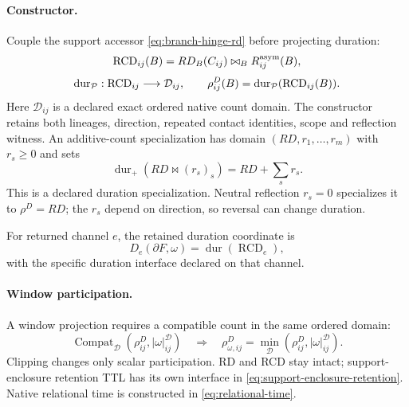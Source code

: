 \paragraph{Constructor.}
\label{subsec:reflection-duration-coupling}
Couple the support accessor \eqref{eq:branch-hinge-rd} before projecting duration:
\begin{equation}
\mathrm{RCD}_{ij}(B)=RD_B(C_{ij})\bowtie_B R^{\mathrm{asym}}_{ij}(B),
\label{eq:rcd-coupling}
\end{equation}
\begin{equation}
\operatorname{dur}_{\mathcal P}:\mathrm{RCD}_{ij}\longrightarrow\mathcal D_{ij},
\qquad \rho^D_{ij}(B)=\operatorname{dur}_{\mathcal P}(\mathrm{RCD}_{ij}(B)).
\label{eq:rcd-duration-participation}
\end{equation}
Here \(\mathcal D_{ij}\) is a declared exact ordered native count domain.
The constructor retains both lineages, direction, repeated contact identities,
scope and reflection witness. An additive-count specialization has domain
\((RD,r_1,\ldots,r_m)\) with \(r_s\ge0\) and sets
\begin{equation}
\operatorname{dur}_{+}(RD\bowtie(r_s)_s)=RD+\sum_s r_s.
\label{eq:rcd-additive-realization}
\end{equation}
This is a declared duration specialization. Neutral reflection \(r_s=0\)
specializes it to \(\rho^D=RD\); the \(r_s\) depend on direction,
so reversal can change duration.

For returned channel \(e\), the retained duration coordinate is
\begin{equation}
D_e(\partial F,\omega)=\operatorname{dur}(\operatorname{RCD}_e),
\label{eq:returned-duration}
\end{equation}
\label{subsec:returned-current-duration-coordinate}
with the specific duration interface declared on that channel.

\paragraph{Window participation.}
A window projection requires a compatible count in the same ordered domain:
\begin{equation}
\operatorname{Compat}_{\mathcal D}(\rho^D_{ij},|\omega|^{\mathcal D}_{ij})
\quad\Longrightarrow\quad
\rho^D_{\omega,ij}=\min_{\mathcal D}(\rho^D_{ij},|\omega|^{\mathcal D}_{ij}).
\label{eq:window-clipped-rho}
\end{equation}
Clipping changes only scalar participation. RD and RCD stay intact;
support-enclosure retention TTL has its own interface in
\eqref{eq:support-enclosure-retention}. Native relational time is constructed in
\eqref{eq:relational-time}.

